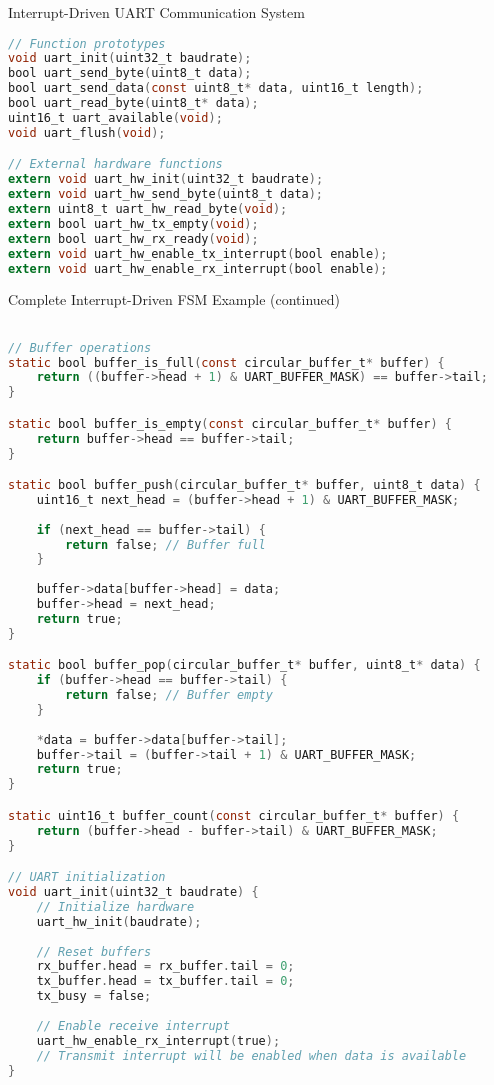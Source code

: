 \begin{example2}{Interrupt-Driven UART Communication System}
\begin{lstlisting}[language=C, style=basesmol]
// Function prototypes
void uart_init(uint32_t baudrate);
bool uart_send_byte(uint8_t data);
bool uart_send_data(const uint8_t* data, uint16_t length);
bool uart_read_byte(uint8_t* data);
uint16_t uart_available(void);
void uart_flush(void);

// External hardware functions
extern void uart_hw_init(uint32_t baudrate);
extern void uart_hw_send_byte(uint8_t data);
extern uint8_t uart_hw_read_byte(void);
extern bool uart_hw_tx_empty(void);
extern bool uart_hw_rx_ready(void);
extern void uart_hw_enable_tx_interrupt(bool enable);
extern void uart_hw_enable_rx_interrupt(bool enable);

\end{lstlisting}
\end{example2}

\begin{example2}{Complete Interrupt-Driven FSM Example (continued)}
\begin{lstlisting}[language=C, style=basesmol]

// Buffer operations
static bool buffer_is_full(const circular_buffer_t* buffer) {
    return ((buffer->head + 1) & UART_BUFFER_MASK) == buffer->tail;
}

static bool buffer_is_empty(const circular_buffer_t* buffer) {
    return buffer->head == buffer->tail;
}

static bool buffer_push(circular_buffer_t* buffer, uint8_t data) {
    uint16_t next_head = (buffer->head + 1) & UART_BUFFER_MASK;
    
    if (next_head == buffer->tail) {
        return false; // Buffer full
    }
    
    buffer->data[buffer->head] = data;
    buffer->head = next_head;
    return true;
}

static bool buffer_pop(circular_buffer_t* buffer, uint8_t* data) {
    if (buffer->head == buffer->tail) {
        return false; // Buffer empty
    }
    
    *data = buffer->data[buffer->tail];
    buffer->tail = (buffer->tail + 1) & UART_BUFFER_MASK;
    return true;
}

static uint16_t buffer_count(const circular_buffer_t* buffer) {
    return (buffer->head - buffer->tail) & UART_BUFFER_MASK;
}

// UART initialization
void uart_init(uint32_t baudrate) {
    // Initialize hardware
    uart_hw_init(baudrate);
    
    // Reset buffers
    rx_buffer.head = rx_buffer.tail = 0;
    tx_buffer.head = tx_buffer.tail = 0;
    tx_busy = false;
    
    // Enable receive interrupt
    uart_hw_enable_rx_interrupt(true);
    // Transmit interrupt will be enabled when data is available
}

\end{lstlisting}
\end{example2}

